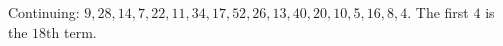 Continuing: $9,28,14,7,22,11,34,17,52,26,13,40,20,10,5,16,8,4$. The first $4$ is the $\boxed{18\text{th}}$ term.
